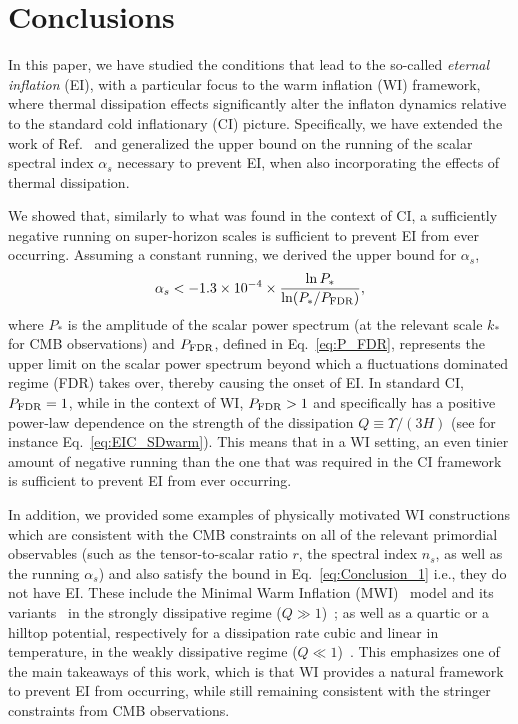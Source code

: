 \documentclass[a4paper,11pt]{article}
\begin{document}
\section{Conclusions}
\label{conclusions}

In this paper, we have studied  the conditions that lead to the
so-called \textit{eternal inflation} (EI), with a particular focus to the
warm inflation (WI) framework, where thermal dissipation effects
significantly alter the inflaton dynamics relative to the standard
cold inflationary (CI) picture. Specifically, we have extended the work of
Ref.~\cite{Kinney:2014jya} and generalized the upper bound on the running of
the scalar spectral index $\alpha_s$ necessary to prevent EI, when also incorporating the effects of thermal dissipation.

We showed that, similarly to what was found in the context of CI, a
sufficiently negative running  on super-horizon scales is sufficient
to prevent EI from ever occurring.  Assuming a constant running, we
derived the upper bound for $\alpha_s$,
%
\begin{eqnarray}
    \alpha_s<- 1.3\times 10^{-4} \times \frac{\ln P_{*}}{
      \ln(P_{*}/P_{\rm{FDR}})}, \label{eq:Conclusion_1}
\end{eqnarray}
where $P_*$ is the amplitude of the scalar power spectrum (at the
relevant scale $k_*$ for CMB observations) and $P_{\rm{FDR}}$, defined in Eq.~\eqref{eq:P_FDR}, represents the upper limit on the scalar power spectrum beyond which a
fluctuations dominated regime (FDR) takes over, thereby causing the
onset of EI. In standard CI, $P_{\rm{FDR}}=1$, while in the context of
WI, $P_{\rm{FDR}}>1$ and specifically has a positive power-law
dependence on the strength of the dissipation $Q\equiv \Upsilon/(3H)$
(see for instance Eq.~\eqref{eq:EIC_SDwarm}). This means that in a WI setting, an even tinier amount of
negative running than the one that was required in the CI framework is sufficient to prevent EI from ever occurring. 

In addition, we provided some examples of physically motivated WI
constructions which are consistent with the CMB constraints on all of
the relevant primordial observables (such as the tensor-to-scalar
ratio $r$, the spectral index $n_s$, as well as the running
$\alpha_s$) and also satisfy the bound in
Eq.~\eqref{eq:Conclusion_1} i.e., they do not have EI. These include the Minimal Warm Inflation (MWI)~\cite{Berghaus:2019whh} model and its variants~\cite{Das:2020xmh} in the strongly dissipative regime ($Q\gg 1$)~\cite{Das:2022ubr}; as well as a quartic or a
hilltop potential, respectively for a dissipation rate cubic and linear in temperature, in the weakly dissipative regime ($Q\ll 1$)~\cite{Benetti:2016jhf}. This emphasizes one of the main takeaways
of this work, which is that WI provides a natural framework to prevent
EI from occurring, while still remaining consistent with the stringer
constraints from CMB observations. 
\end{document}
